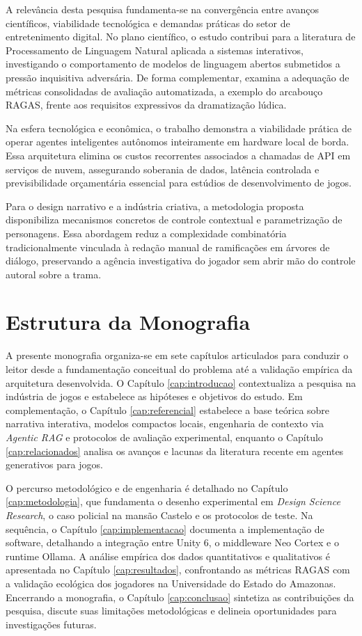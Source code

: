 A relevância desta pesquisa fundamenta-se na convergência entre avanços científicos, viabilidade tecnológica e demandas práticas do setor de entretenimento digital. No plano científico, o estudo contribui para a literatura de Processamento de Linguagem Natural aplicada a sistemas interativos, investigando o comportamento de modelos de linguagem abertos submetidos a pressão inquisitiva adversária. De forma complementar, examina a adequação de métricas consolidadas de avaliação automatizada, a exemplo do arcabouço RAGAS, frente aos requisitos expressivos da dramatização lúdica.

Na esfera tecnológica e econômica, o trabalho demonstra a viabilidade prática de operar agentes inteligentes autônomos inteiramente em hardware local de borda. Essa arquitetura elimina os custos recorrentes associados a chamadas de API em serviços de nuvem, assegurando soberania de dados, latência controlada e previsibilidade orçamentária essencial para estúdios de desenvolvimento de jogos.

Para o design narrativo e a indústria criativa, a metodologia proposta disponibiliza mecanismos concretos de controle contextual e parametrização de personagens. Essa abordagem reduz a complexidade combinatória tradicionalmente vinculada à redação manual de ramificações em árvores de diálogo, preservando a agência investigativa do jogador sem abrir mão do controle autoral sobre a trama.

\section{Estrutura da Monografia}
\label{sec:estrutura}

A presente monografia organiza-se em sete capítulos articulados para conduzir o leitor desde a fundamentação conceitual do problema até a validação empírica da arquitetura desenvolvida. O Capítulo \ref{cap:introducao} contextualiza a pesquisa na indústria de jogos e estabelece as hipóteses e objetivos do estudo. Em complementação, o Capítulo \ref{cap:referencial} estabelece a base teórica sobre narrativa interativa, modelos compactos locais, engenharia de contexto via \textit{Agentic RAG} e protocolos de avaliação experimental, enquanto o Capítulo \ref{cap:relacionados} analisa os avanços e lacunas da literatura recente em agentes generativos para jogos.

O percurso metodológico e de engenharia é detalhado no Capítulo \ref{cap:metodologia}, que fundamenta o desenho experimental em \textit{Design Science Research}, o caso policial na mansão Castelo e os protocolos de teste. Na sequência, o Capítulo \ref{cap:implementacao} documenta a implementação de software, detalhando a integração entre Unity 6, o middleware Neo Cortex e o runtime Ollama. A análise empírica dos dados quantitativos e qualitativos é apresentada no Capítulo \ref{cap:resultados}, confrontando as métricas RAGAS com a validação ecológica dos jogadores na Universidade do Estado do Amazonas. Encerrando a monografia, o Capítulo \ref{cap:conclusao} sintetiza as contribuições da pesquisa, discute suas limitações metodológicas e delineia oportunidades para investigações futuras.
